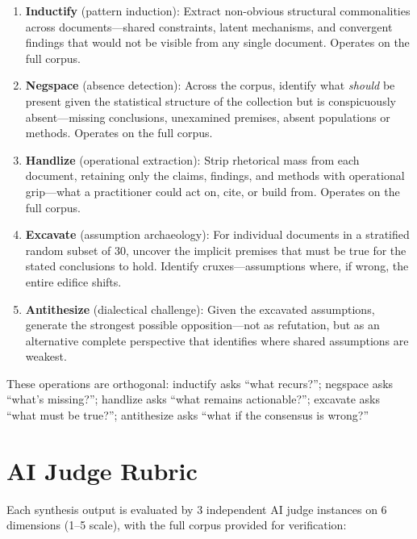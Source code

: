\documentclass{article}
\begin{document}
\begin{enumerate}
    \item \textbf{Inductify} (pattern induction): Extract non-obvious structural commonalities across documents---shared constraints, latent mechanisms, and convergent findings that would not be visible from any single document. Operates on the full corpus.
    \item \textbf{Negspace} (absence detection): Across the corpus, identify what \textit{should} be present given the statistical structure of the collection but is conspicuously absent---missing conclusions, unexamined premises, absent populations or methods. Operates on the full corpus.
    \item \textbf{Handlize} (operational extraction): Strip rhetorical mass from each document, retaining only the claims, findings, and methods with operational grip---what a practitioner could act on, cite, or build from. Operates on the full corpus.
    \item \textbf{Excavate} (assumption archaeology): For individual documents in a stratified random subset of 30, uncover the implicit premises that must be true for the stated conclusions to hold. Identify cruxes---assumptions where, if wrong, the entire edifice shifts.
    \item \textbf{Antithesize} (dialectical challenge): Given the excavated assumptions, generate the strongest possible opposition---not as refutation, but as an alternative complete perspective that identifies where shared assumptions are weakest.
\end{enumerate}

These operations are orthogonal: inductify asks ``what recurs?''; negspace asks ``what's missing?''; handlize asks ``what remains actionable?''; excavate asks ``what must be true?''; antithesize asks ``what if the consensus is wrong?''

\section{AI Judge Rubric}
\label{app:rubric}

Each synthesis output is evaluated by 3 independent AI judge instances on 6 dimensions (1--5 scale), with the full corpus provided for verification:
\end{document}
